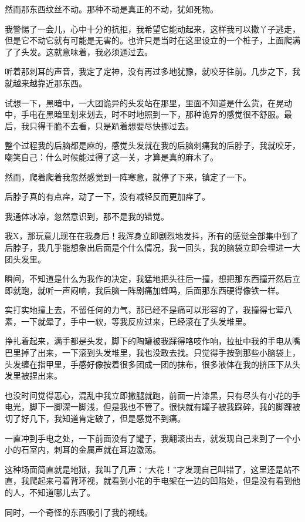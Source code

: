 然而那东西纹丝不动。那种不动是真正的不动，犹如死物。

我警惕了一会儿，心中十分的抗拒，我希望它能动起来，这样我可以撒丫子逃走，但是它不动它就有可能是无害的。也许只是当时在这里设立的一个桩子，上面爬满了了头发。这就意味着，我必须通过去。

听着那刺耳的声音，我定了定神，没有再过多地犹豫，就咬牙往前。几步之下，我就越来越靠近那东西。

试想一下，黑暗中，一大团诡异的头发站在那里，里面不知道是什么货，在晃动中，手电在黑暗里划来划去，时不时地照到一下，那种诡异的感觉很不舒服。最后，我只得干脆不去看，只是趴着想要尽快挪过去。

整个过程我的后脑都是麻的，感觉头发就在我的后脑刺痛我的后脖子，我就咬牙，嘲笑自己：什么时候能过得了这一关，才算是真的麻木了。

然而，爬着爬着我忽然感觉到一阵寒意，就停了下来，镇定了一下。

后脖子真的有点痒，动了一下，没有减轻反而更加痒了。

我通体冰凉，忽然意识到，那不是我的错觉。

我X，那玩意儿现在在我身后！我浑身立即剧烈地发抖，所有的感觉全部集中到了后脖子，我几乎能想象出后面是个什么情况，我一回头，我的脑袋立即会埋进一大团头发里。

瞬间，不知道是什么为我作的决定，我猛地把头往后一撞，想把那东西撞开然后立即就跑，就听一声闷响，我后脑一阵剧痛加蜂鸣，后面那东西硬得像铁一样。

实打实地撞上去，不留任何的力气，那已经不是痛可以形容的了，我撞得七荤八素，一下就晕了，手中一软，等我反应过来，已经滚在了头发堆里。

挣扎着起来，满手都是头发，脚下的陶罐被我踩得咯吱作响，拉扯中我的手电从嘴巴里掉了出来，一下滚到头发堆里，我也没敢去找。只觉得手按到那些小脑袋上，头发缠在指甲里，手感好像按着很多团成一团的抹布，很多液体在我的挤压下从头发里被捏出来。

也没时间觉得恶心，混乱中我立即撒腿就跑，前面一片漆黑，只有尽头有小花的手电光，脚下一脚深一脚浅，但是我也不管了。很快就有罐子被我踩碎，我的脚踝被切了好几下，我知道肯定破了，但是感觉不到痛。

一直冲到手电之处，一下前面没有了罐子，我翻滚出去，就发现自己来到了一个小小的石室内，刺耳的金属声就在耳边激荡。

这种场面简直就是地狱，我叫了几声：“大花！”才发现自己叫错了，这里还是站不直，我爬起来弓着背环视，就看到小花的手电架在一边的凹陷处，但是没有看到他的人，不知道哪儿去了。

同时，一个奇怪的东西吸引了我的视线。

